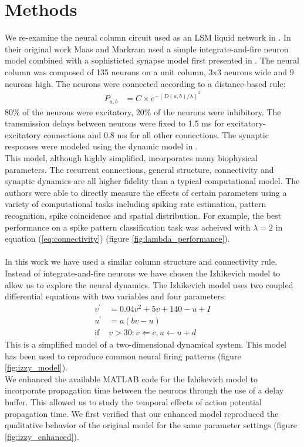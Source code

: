 \documentclass[a4paper,11pt]{article}
\begin{document}
\section{Methods}
We re-examine the neural column circuit used as an LSM liquid network in \cite{maas2002}.
In their original work Maas and Markram used a simple integrate-and-fire neuron model combined with a sophisticted synapse model first presented in \cite{markram1998}.
The neural column was composed of 135 neurons on a unit column, 3x3 neurons wide and 9 neurons high.
The neurons were connected according to a distance-based rule:
\begin{align}\label{eq:connectivity}
 P_{a,b} &= C \times e^{-(D(a,b)/\lambda)^2}
\end{align}
80\% of the neurons were excitatory, 20\% of the neurons were inhibitory. 
The transmission delays between neurons were fixed to 1.5 ms for excitatory-excitatory connections and 0.8 ms for all other connections.
The synaptic responses were modeled using the dynamic model in \cite{markram1998}. \\
This model, although highly simplified, incorporates many biophysical parameters.
The recurrent connections, general structure, connectivity and synaptic dynamics are all higher fidelity than a typical computational model.
The authors were able to directly measure the effects of certain parameters using a variety of computational tasks including spiking rate estimation, pattern recognition, spike coincidence and spatial distribution. 
For example, the best performance on a spike pattern classification task was acheived with $\lambda=2$ in equation (\ref{eq:connectivity}) (figure \ref{fig:lambda_performance}).
\\ \\
In this work we have used a similar column structure and connectivity rule.
Instead of integrate-and-fire neurons we have chosen the Izhikevich model \cite{izhikevich2003} to allow us to explore the neural dynamics.
The Izhikevich model uses two coupled differential equations with two variables and four parameters:
\begin{align}
 v^\prime &= 0.04v^2+5v+140-u+I\\
 u^\prime &= a(bv-u)\\
 \text{if } &v>30: v\Leftarrow c, u\leftarrow u+d
\end{align}
This is a simplified model of a two-dimensional dynamical system.
This model has been used to reproduce common neural firing patterns (figure \ref{fig:izzy_model}). \\
We enhanced the available MATLAB code for the Izhikevich model to incorporate propagation time between the neurons through the use of a delay buffer.
This allowed us to study the temporal effects of action potential propagation time.
We first verified that our enhanced model reproduced the qualitative behavior of the original model for the same parameter settings (figure \ref{fig:izzy_enhanced}).\\
\end{document}
